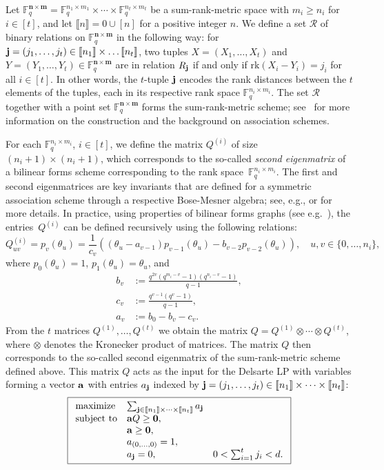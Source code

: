 \documentclass[a4paper]{article}
\newcommand{\F}{\mathbb{F}}
\newcommand{\bfn}{\mathbf {n}}
\newcommand{\bfm}{\mathbf {m}}
\newcommand{\spac}{\F^{\bfn\times\bfm}_q}
\newcommand{\rk}{\mathrm{rk}}
\newcommand{\db}[1]{\llbracket #1 \rrbracket}
\begin{document}
Let $\spac=\mathbb{F}_q^{n_1\times m_1}\times \cdots \times
\mathbb{F}_q^{n_t\times m_t}$ be a sum-rank-metric space with $m_i\geq n_i$ for $i\in[t]$, and let $\db{n}=0\cup[n]$ for a positive integer $n$. We define a set $\mathcal{R}$ of binary relations on $\spac$ in the following way: for ${\bf j}=(j_1,\dots,j_t)\in\db{n_1}\times\dots\db{n_t}$, two tuples $X=(X_1,\dots,X_t)$ and $Y=(Y_1,\dots,Y_t)\in\spac$ are in relation $R_{\bf j}$ if and only if $\rk(X_i-Y_i)=j_i$ for all $i\in[t]$. In other words, the $t$-tuple $\bf j$ encodes the rank distances between the $t$ elements of the tuples, each in its respective rank space $\F_q^{n_i\times m_i}$. The set $\mathcal{R}$ together with a point set $\spac$ forms the sum-rank-metric scheme; see~\cite{AGKP2024} for more information on the construction and the background on association schemes.

For each $\F_q^{n_i\times m_i}$, $i\in[t]$, we define the matrix $Q^{(i)}$ of size~$(n_i+1)\times(n_i+1)$, which corresponds to the so-called \emph{second eigenmatrix} of a bilinear forms scheme corresponding to the rank space~$\F_q^{n_i\times m_i}$. The first and second eigenmatrices are key invariants that are defined for a symmetric association scheme through a respective Bose-Mesner algebra; see, e.g., \cite{DelsarteLP} or \cite[Chapter 2]{BCNbookDRG} for more details. In practice, using properties of bilinear forms graphs (see e.g.~\cite{BCNbookDRG,AGKP2024}), the entries~$Q^{(i)}$ can be defined recursively using the following relations:
$$Q^{(i)}_{uv}=p_v(\theta_u)=\frac1{c_v} \left( (\theta_u - a_{v-1}) p_{v-1}(\theta_u) - b_{v-2} p_{v-2}(\theta_u)\right),\quad u,v\in \{0,\dots,n_i\},$$
where $p_0(\theta_u)=1$, $p_1(\theta_u)=\theta_u$, and 
\begin{align*}
b_v &:= \frac{q^{2v}(q^{m_i-v}-1)(q^{n_i-v}-1)}{q-1}, \\
c_v &:= \frac{q^{v-1}(q^v-1)}{q-1}, 
\\
a_v &:= b_0 - b_v - c_v.
\end{align*}
From the $t$ matrices $Q^{(1)},\dots,Q^{(t)}$ we obtain the matrix $Q=Q^{(1)}\otimes\cdots\otimes Q^{(t)}$, where $\otimes$ denotes the Kronecker product of matrices. The matrix $Q$ then corresponds to the so-called second eigenmatrix of the sum-rank-metric scheme defined above. This matrix $Q$ acts as the input for the Delsarte LP with variables forming a vector $\bf a$ with entries $a_{\bf j}$ indexed by ${\bf j}=(j_1,\dots,j_t)\in\db{n_1}\times\cdots\times\db{n_t}$:
\begin{equation}\label{eq:LPsrk}
\boxed{
\begin{array}{ll@{}ll}
\text{maximize}  &\sum_{{\bf j}\in \db{n_1} \times\cdots\times \db{n_t}} a_{\bf j} &\\
\text{subject to} &\mathbf{a}Q\geq \mathbf{0},\\
&\mathbf{a}\geq \mathbf{0},\\
&a_{(0,\ldots,0)}=1,\\
&a_{\bf j} = 0, &\quad 0<\sum_{i=1}^t j_i<d.
\end{array}
}
\end{equation}
\end{document}
